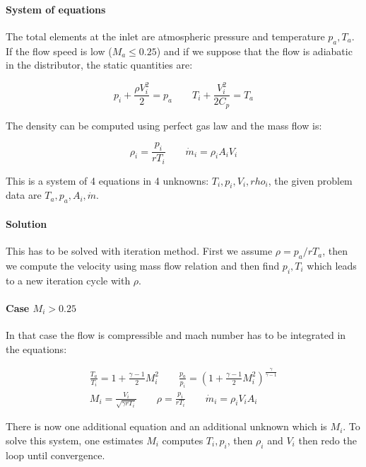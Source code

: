 \paragraph{System of equations}
The total elements at the inlet are atmospheric pressure and temperature $p_a, T_a$. If the flow speed is low ($M_a \leq 0.25$) and if we suppose that the flow is adiabatic in the distributor, the static quantities are: 

\begin{equation}
p_i + \frac{\rho V_i^2}{2} = p_a \qquad T_i + \frac{V_i^2}{2C_p}= T_a
\end{equation}

The density can be computed using perfect gas law and the mass flow is: 

\begin{equation}
\rho _i = \frac{p_i}{rT_i} \qquad \dot{m}_i = \rho _iA_iV_i
\end{equation}

This is a system of 4 equations in 4 unknowns: $T_i,p_i,V_i,rho_i$, the given problem data are $T_a,p_a,A_i,\dot{m}$.

\paragraph{Solution}
This has to be solved with iteration method. First we assume $\rho = p_a/rT_a$, then we compute the velocity using mass flow relation and then find $p_i,T_i$ which leads to a new iteration cycle with $\rho$. 

\paragraph{Case $M_i > 0.25$}
In that case the flow is compressible and mach number has to be integrated in the equations: 

\begin{equation}
\begin{aligned}
\frac{T_a}{T_i} = 1+ \frac{\gamma -1}{2} M_i^2\qquad \frac{p_a}{p_i} = \left(1+ \frac{\gamma -1}{2} M_i^2\right)^{\frac{\gamma}{\gamma -1}}\\
M_i = \frac{V_i}{\sqrt{\gamma rT_i}} \qquad \rho = \frac{p_i}{rT_i} \qquad \dot{m}_i = \rho _i V_i A_i
\end{aligned}
\end{equation}

There is now one additional equation and an additional unknown which is $M_i$. To solve this system, one estimates $M_i$ computes $T_i, p_i$, then $\rho _i$ and $V_i$ then redo the loop until convergence. 

